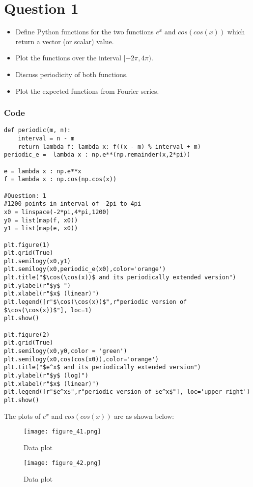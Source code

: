 \documentclass[11pt, a4paper, twoside]{article}
\begin{document}
\section{Question 1}
\begin{itemize}[label=-]
\item Define Python functions for the two functions $e^x$ and $cos(cos(x))$ which return a vector (or scalar) value.
\item Plot the functions over the interval $[-2\pi,4\pi)$.
\item Discuss periodicity of both functions.
\item Plot the expected functions from Fourier series.
\end{itemize}
\subsubsection{Code}
\begin{verbatim}
def periodic(m, n):
    interval = n - m
    return lambda f: lambda x: f((x - m) % interval + m)
periodic_e =  lambda x : np.e**(np.remainder(x,2*pi))

e = lambda x : np.e**x
f = lambda x : np.cos(np.cos(x))

#Question: 1
#1200 points in interval of -2pi to 4pi
x0 = linspace(-2*pi,4*pi,1200) 
y0 = list(map(f, x0))  
y1 = list(map(e, x0))

plt.figure(1)
plt.grid(True)
plt.semilogy(x0,y1)
plt.semilogy(x0,periodic_e(x0),color='orange')
plt.title("$\cos(\cos(x))$ and its periodically extended version")
plt.ylabel(r"$y$ ")
plt.xlabel(r"$x$ (linear)")
plt.legend([r"$\cos(\cos(x))$",r"periodic version of $\cos(\cos(x))$"], loc=1)
plt.show()

plt.figure(2)      
plt.grid(True)
plt.semilogy(x0,y0,color = 'green')
plt.semilogy(x0,cos(cos(x0)),color='orange')
plt.title("$e^x$ and its periodically extended version")
plt.ylabel(r"$y$ (log)")
plt.xlabel(r"$x$ (linear)")
plt.legend([r"$e^x$",r"periodic version of $e^x$"], loc='upper right')
plt.show()
\end{verbatim}
\newpage
The plots of $e^{x}$ and $cos(cos(x))$ are as shown below:
      \begin{figure}[!tbh]
   	\centering
   	\texttt{[image: figure\_41.png]}   
   	\caption{Data plot}
   	\label{fig:sample}
   \end{figure} 
\begin{figure}[!tbh]
   	\centering
   	\texttt{[image: figure\_42.png]}   
   	\caption{Data plot}
   	\label{fig:sample}
\end{figure}
\end{document}
